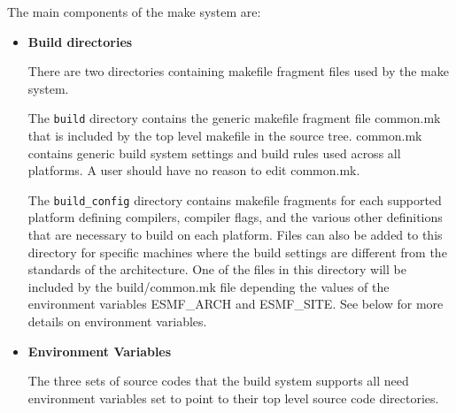 The main components of the make system are:
\begin{itemize}
\item{{\bf Build directories}}

There are two directories containing makefile fragment files used by
the make system.  

The {\tt build} directory contains the generic makefile fragment file
common.mk that is included by the top level makefile in the source
tree.  common.mk contains generic build system settings and build
rules used across all platforms.  A user should have no reason to edit
common.mk.

The {\tt build\_config} directory contains makefile fragments for each
supported platform defining compilers, compiler flags, and the various
other definitions that are necessary to build on each platform.  Files
can also be added to this directory for specific machines where the
build settings are different from the standards of the architecture.
One of the files in this directory will be included by the
build/common.mk file depending the values of the environment variables
ESMF\_ARCH and ESMF\_SITE.  See below for more details on environment
variables.

\item{{\bf Environment Variables}}

The three sets of source codes that the build system supports all need
environment variables set to point to their top level source code
directories.

\end{itemize}

